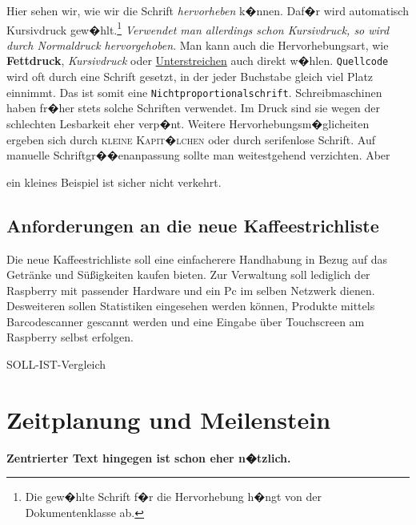 \documentclass[11pt,a4paper]{article} %
\begin{document}
Hier sehen wir, wie wir die Schrift \emph{hervorheben} k�nnen. Daf�r wird automatisch Kursivdruck gew�hlt.\footnote{Die gew�hlte Schrift f�r die Hervorhebung h�ngt von der Dokumentenklasse ab.} \textit{Verwendet man allerdings schon Kursivdruck, so wird durch \emph{Normaldruck} hervorgehoben}. Man kann auch die Hervorhebungsart, wie \textbf{Fettdruck}, \textit{Kursivdruck} oder \underline{Unterstreichen} auch direkt w�hlen. \texttt{Quellcode} wird oft durch eine Schrift gesetzt, in der jeder Buchstabe gleich viel Platz einnimmt. Das ist somit eine \texttt{Nichtproportionalschrift}. Schreibmaschinen haben fr�her stets solche Schriften verwendet. Im Druck sind sie wegen der schlechten Lesbarkeit eher verp�nt. Weitere Hervorhebungsm�glicheiten ergeben sich durch \textsc{kleine Kapit�lchen} oder durch \textsf{serifenlose Schrift}. Auf manuelle Schriftgr��enanpassung sollte man weitestgehend verzichten. Aber \begin{tiny} ein kleines Beispiel ist sicher nicht verkehrt.\end{tiny}

\subsection{Anforderungen an die neue Kaffeestrichliste}
\label{Ausrichtung}

\begin{flushleft}
Die neue Kaffeestrichliste soll eine einfacherere Handhabung in Bezug auf das Getr\"anke und S\"u\ss{}igkeiten kaufen bieten. Zur Verwaltung soll lediglich der Raspberry mit passender Hardware und ein Pc im selben Netzwerk dienen. Desweiteren sollen Statistiken eingesehen werden k\"onnen, Produkte mittels Barcodescanner gescannt werden und eine Eingabe \"uber Touchscreen am Raspberry selbst erfolgen.
\end{flushleft}

\begin{flushleft}
SOLL-IST-Vergleich
\end{flushleft}


\section{Zeitplanung und Meilenstein}

\begin{center}
\begin{large}
\textbf{Zentrierter Text hingegen ist schon eher n�tzlich.}
\end{large}
\end{center}
\end{document}
